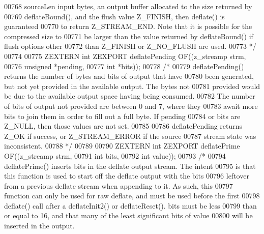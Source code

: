 \begin{DoxyCode}
00768 \textcolor{comment}{   sourceLen input bytes, an output buffer allocated to the size returned by}
00769 \textcolor{comment}{   deflateBound(), and the flush value Z\_FINISH, then deflate() is guaranteed}
00770 \textcolor{comment}{   to return Z\_STREAM\_END.  Note that it is possible for the compressed size to}
00771 \textcolor{comment}{   be larger than the value returned by deflateBound() if flush options other}
00772 \textcolor{comment}{   than Z\_FINISH or Z\_NO\_FLUSH are used.}
00773 \textcolor{comment}{*/}
00774 
00775 ZEXTERN \textcolor{keywordtype}{int} ZEXPORT deflatePending OF((z\_streamp strm,
00776                                        \textcolor{keywordtype}{unsigned} *pending,
00777                                        \textcolor{keywordtype}{int} *bits));
00778 \textcolor{comment}{/*}
00779 \textcolor{comment}{     deflatePending() returns the number of bytes and bits of output that have}
00780 \textcolor{comment}{   been generated, but not yet provided in the available output.  The bytes not}
00781 \textcolor{comment}{   provided would be due to the available output space having being consumed.}
00782 \textcolor{comment}{   The number of bits of output not provided are between 0 and 7, where they}
00783 \textcolor{comment}{   await more bits to join them in order to fill out a full byte.  If pending}
00784 \textcolor{comment}{   or bits are Z\_NULL, then those values are not set.}
00785 \textcolor{comment}{}
00786 \textcolor{comment}{     deflatePending returns Z\_OK if success, or Z\_STREAM\_ERROR if the source}
00787 \textcolor{comment}{   stream state was inconsistent.}
00788 \textcolor{comment}{ */}
00789 
00790 ZEXTERN \textcolor{keywordtype}{int} ZEXPORT deflatePrime OF((z\_streamp strm,
00791                                      \textcolor{keywordtype}{int} bits,
00792                                      \textcolor{keywordtype}{int} value));
00793 \textcolor{comment}{/*}
00794 \textcolor{comment}{     deflatePrime() inserts bits in the deflate output stream.  The intent}
00795 \textcolor{comment}{   is that this function is used to start off the deflate output with the bits}
00796 \textcolor{comment}{   leftover from a previous deflate stream when appending to it.  As such, this}
00797 \textcolor{comment}{   function can only be used for raw deflate, and must be used before the first}
00798 \textcolor{comment}{   deflate() call after a deflateInit2() or deflateReset().  bits must be less}
00799 \textcolor{comment}{   than or equal to 16, and that many of the least significant bits of value}
00800 \textcolor{comment}{   will be inserted in the output.}

\end{DoxyCode}
